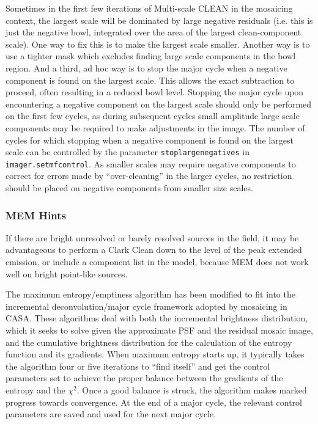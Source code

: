 Sometimes in the first few iterations of Multi-scale CLEAN in the
mosaicing context, the largest scale will be dominated by large
negative residuals (i.e. this is just the negative bowl, integrated
over the area of the largest clean-component scale).  One way to fix
this is to make the largest scale smaller.  Another way is to use a
tighter mask which excludes finding large scale components in the bowl
region.  And a third, ad hoc way is to stop the major cycle when a
negative component is found on the largest scale.  This allows the
exact subtraction to proceed, often resulting in a reduced bowl level.
Stopping the major cycle upon encountering a negative component on the
largest scale should only be performed on the first few cycles, as
during subsequent cycles small amplitude large scale components may be
required to make adjustments in the image.  The number of cycles for
which stopping when a negative component is found on the largest scale
can be controlled by the parameter {\tt stoplargenegatives} in {\tt
imager.setmfcontrol}.  As smaller scales may require negative
components to correct for errors made by ``over-cleaning'' in the
larger cycles, no restriction should be placed on negative components
from smaller size scales.

\subsubsection{MEM Hints}
\label{section:imtool.mosaic.details.mem}

If there are bright unresolved or barely resolved sources in the field,
it may be advantageous to perform a Clark Clean down to the level of the
peak extended emission, or include a component list in the model,
because MEM does not work well on bright point-like sources.

The maximum entropy/emptiness algorithm has been modified to fit into
the incremental deconvolution/major cycle framework adopted by
mosaicing in CASA.  These algorithms deal with both the incremental
brightness distribution, which it seeks to solve given the approximate
PSF and the residual mosaic image, and the cumulative brightness
distribution for the calculation of the entropy function and its
gradients.  When maximum entropy starts up, it typically takes the
algorithm four or five iterations to ``find itself'' and get the
control parameters set to achieve the proper balance between the
gradients of the entropy and the $\chi^2$.  Once a good balance is
struck, the algorithm makes marked progress towards convergence.  At
the end of a major cycle, the relevant control parameters are saved
and used for the next major cycle.

